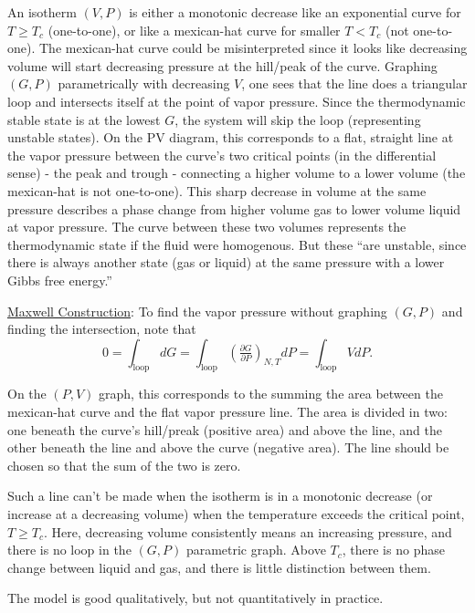 \documentclass[12pt]{article}
\begin{document}
\begin{minipage}[t]{.56\textwidth}
    \setlength{\parindent}{.5cm}
    \scriptsize
    An isotherm \((V,P)\) is either a monotonic decrease like an exponential curve for \(T \geq T_c\) (one-to-one), 
    or like a mexican-hat curve for smaller \(T < T_c\) (not one-to-one). The mexican-hat curve could be misinterpreted
    since it looks like decreasing volume will start decreasing pressure at the hill/peak of the curve. Graphing 
    \((G,P)\) parametrically with decreasing \(V\), one sees that the line does a triangular loop and intersects itself 
    at the point of vapor pressure. Since the thermodynamic stable state is at the lowest \(G\), the system will skip 
    the loop (representing unstable states). On the PV diagram, this corresponds to a flat, straight line at the 
    vapor pressure between the curve's two critical points (in the differential sense) - the peak and trough - 
    connecting a higher volume to a lower volume (the mexican-hat is not one-to-one). This sharp decrease in volume at 
    the same pressure describes a phase change from higher volume gas to lower volume liquid at vapor pressure. The 
    curve between these two volumes represents the thermodynamic state if the fluid were homogenous. But these ``are
    unstable, since there is always another state (gas or liquid) at the same pressure with a lower Gibbs
    free energy.''

    \vspace{10pt}

    \underline{Maxwell Construction}:
    To find the vapor pressure without graphing \((G,P)\) and finding the intersection, note that
    \[0 = \int_\text{loop} dG = \int_\text{loop} \left( \tfrac{\partial G}{\partial P} \right)_{N,T} dP
        = \int_\text{loop} V dP.\] 
\end{minipage}

\vspace{15pt}
{\scriptsize \noindent
On the \((P,V)\) graph, this corresponds to the summing the area between the 
mexican-hat curve and the flat vapor pressure line. The area is divided in two: one beneath the curve's hill/preak 
(positive area) and above the line, and the other beneath the line and above the curve (negative area). The line
should be chosen so that the sum of the two is zero. 

\vspace{5pt}

Such a line can't be made when the isotherm is in a monotonic decrease (or increase at a decreasing volume) when 
the temperature exceeds the critical point, \(T \geq T_c\). Here, decreasing volume consistently means an 
increasing pressure, and there is no loop in the \((G,P)\) parametric graph. Above \(T_c\), there is no phase 
change between liquid and gas, and there is little distinction between them.

\vspace{5pt}

The model is good qualitatively, but not quantitatively in practice.

}
\end{document}
